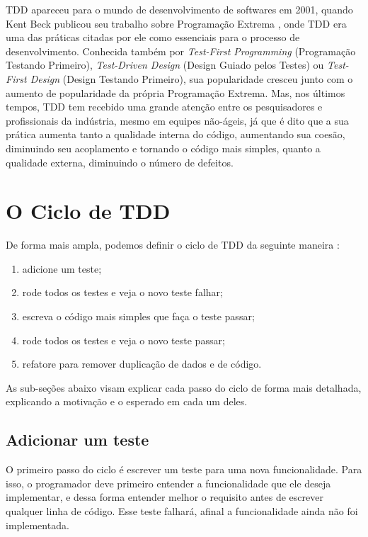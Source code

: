 
TDD apareceu para o mundo de desenvolvimento de softwares em 2001, quando Kent Beck publicou seu trabalho sobre Programação Extrema \cite{XPExplained},
onde TDD era uma das práticas citadas por ele como essenciais para o processo de desenvolvimento. Conhecida também
por \textit{Test-First Programming} (Programação Testando Primeiro), \textit{Test-Driven Design} (Design Guiado pelos Testes) ou 
\textit{Test-First Design} (Design Testando Primeiro), sua popularidade cresceu junto com o aumento de popularidade da própria Programação Extrema. 
Mas, nos últimos tempos, TDD tem recebido uma grande atenção entre os pesquisadores e profissionais da indústria, mesmo em equipes não-ágeis, já que
é dito que a sua prática aumenta tanto a qualidade interna do código, aumentando sua coesão, diminuindo seu acoplamento e tornando
o código mais simples, quanto a qualidade externa, diminuindo o número de defeitos.

\section{O Ciclo de TDD} 
\label{sec:tdd-ciclo}

De forma mais ampla, podemos definir o ciclo de TDD da seguinte maneira \cite{TDDByExample}:

\begin{enumerate}
	\item adicione um teste; 
	\item rode todos os testes e veja o novo teste falhar; 
	\item escreva o código mais simples que faça o teste passar; 
	\item rode todos os testes e veja o novo teste passar; 
	\item refatore para remover duplicação de dados e de código.
\end{enumerate}

As sub-seções abaixo visam explicar cada passo do ciclo de forma mais detalhada, explicando a motivação e o esperado 
em cada um deles.

\subsection{Adicionar um teste}

O primeiro passo do ciclo é escrever um teste para uma nova funcionalidade. Para isso, o programador deve primeiro entender a funcionalidade 
que ele deseja implementar, e dessa forma entender melhor o requisito antes de escrever qualquer linha de código.
Esse teste falhará, afinal a funcionalidade ainda não foi implementada. 

